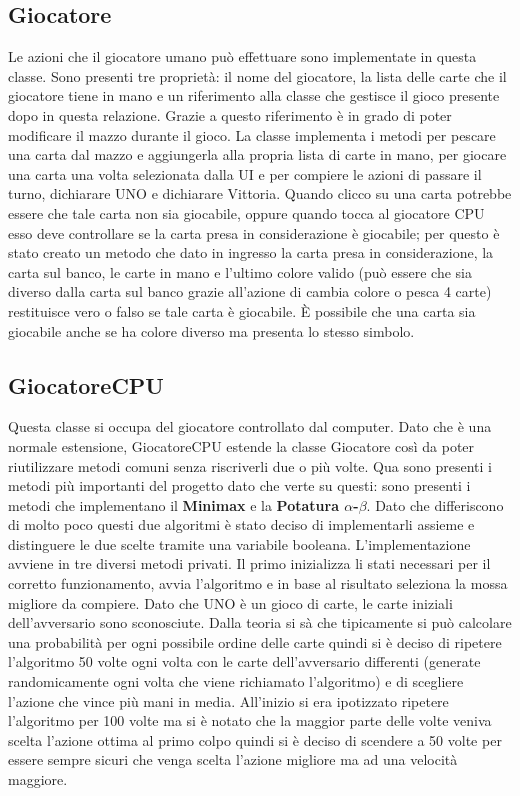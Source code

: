 	\subsection{Giocatore}
		Le azioni che il giocatore umano può effettuare sono implementate in questa classe. Sono presenti tre proprietà: il nome del giocatore, la lista delle carte che il giocatore tiene in mano e un riferimento alla classe che gestisce il gioco presente dopo in questa relazione. Grazie a questo riferimento è in grado di poter modificare il mazzo durante il gioco. La classe implementa i metodi per pescare una carta dal mazzo e aggiungerla alla propria lista di carte in mano, per giocare una carta una volta selezionata dalla UI e per compiere le azioni di passare il turno, dichiarare UNO e dichiarare Vittoria. Quando clicco su una carta potrebbe essere che tale carta non sia giocabile, oppure quando tocca al giocatore CPU esso deve controllare se la carta presa in considerazione è giocabile; per questo è stato creato un metodo che dato in ingresso la carta presa in considerazione, la carta sul banco, le carte in mano e l'ultimo colore valido (può essere che sia diverso dalla carta sul banco grazie all'azione di cambia colore o pesca 4 carte) restituisce vero o falso se tale carta è giocabile. È possibile che una carta sia giocabile anche se ha colore diverso ma presenta lo stesso simbolo.
		
	\subsection{GiocatoreCPU}	
		Questa classe si occupa del giocatore controllato dal computer. Dato che è una normale estensione, GiocatoreCPU estende la classe Giocatore così da poter riutilizzare metodi comuni senza riscriverli due o più volte. Qua sono presenti i metodi più importanti del progetto dato che verte su questi: sono presenti i metodi che implementano il \textbf{Minimax} e la \textbf{Potatura $\alpha$-$\beta$}. Dato che differiscono di molto poco questi due algoritmi è stato deciso di implementarli assieme e distinguere le due scelte tramite una variabile booleana. L'implementazione avviene in tre diversi metodi privati. Il primo inizializza li stati necessari per il corretto funzionamento, avvia l'algoritmo e in base al risultato seleziona la mossa migliore da compiere. Dato che UNO è un gioco di carte, le carte iniziali dell'avversario sono sconosciute. Dalla teoria si sà che tipicamente si può calcolare una probabilità per ogni possibile ordine delle carte quindi si è deciso di ripetere l'algoritmo 50 volte ogni volta con le carte dell'avversario differenti (generate randomicamente ogni volta che viene richiamato l'algoritmo) e di scegliere l'azione che vince più mani in media. All'inizio si era ipotizzato ripetere l'algoritmo per 100 volte ma si è notato che la maggior parte delle volte veniva scelta l'azione ottima al primo colpo quindi si è deciso di scendere a 50 volte per essere sempre sicuri che venga scelta l'azione migliore ma ad una velocità maggiore. \\
		
